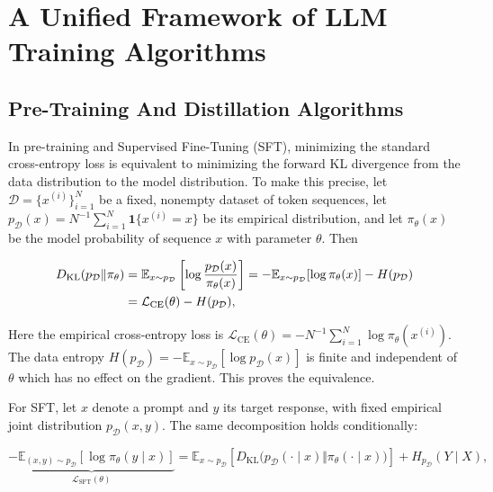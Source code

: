 \section{A Unified Framework of LLM Training Algorithms}

\subsection{Pre-Training And Distillation Algorithms}

In pre-training and Supervised Fine-Tuning (SFT), minimizing the standard
cross-entropy loss is equivalent to minimizing the forward KL divergence
from the data distribution to the model distribution.
To make this precise, let $\mathcal{D}=\{x^{(i)}\}_{i=1}^N$ be a fixed,
nonempty dataset of token sequences, let
$p_{\mathcal{D}}(x)=N^{-1}\sum_{i=1}^N\mathbf{1}\{x^{(i)}=x\}$ be its
empirical distribution, and let $\pi_\theta(x)$ be the model probability
of sequence $x$ with parameter $\theta$. Then

\begin{align}
 D_{\mathrm{KL}}(p_{\mathcal{D}}\Vert\pi_\theta)
 &= \mathbb{E}_{x\sim p_{\mathcal{D}}}
    \left[\log\frac{p_{\mathcal{D}}(x)}{\pi_\theta(x)}\right] \notag = -\mathbb{E}_{x\sim p_{\mathcal{D}}}[\log\pi_\theta(x)]
    -H(p_{\mathcal{D}}) \notag\\
 &= \mathcal{L}_{\mathrm{CE}}(\theta)-H(p_{\mathcal{D}}),
 \label{eq:ce-forward-kl}
\end{align}

Here the empirical cross-entropy loss is
$\mathcal{L}_{\mathrm{CE}}(\theta)=-N^{-1}\sum_{i=1}^N
\log\pi_\theta(x^{(i)})$.
The data entropy $H(p_{\mathcal{D}})=-\mathbb{E}_{x\sim p_{\mathcal{D}}}
[\log p_{\mathcal{D}}(x)]$ is finite and independent of $\theta$ which has no effect on the gradient. This proves the equivalence.

For SFT, let $x$ denote a prompt and $y$ its target response, with fixed
empirical joint distribution $p_{\mathcal{D}}(x,y)$. The same decomposition
holds conditionally:

\begin{equation}
 \underbrace{-\mathbb{E}_{(x,y)\sim p_{\mathcal{D}}}
 [\log\pi_\theta(y\mid x)]}_{\mathcal{L}_{\mathrm{SFT}}(\theta)}
 =\mathbb{E}_{x\sim p_{\mathcal{D}}}
 \left[D_{\mathrm{KL}}\bigl(p_{\mathcal{D}}(\cdot\mid x)
 \Vert\pi_\theta(\cdot\mid x)\bigr)\right]
 +H_{p_{\mathcal{D}}}(Y\mid X),
 \label{eq:sft-conditional-kl}
\end{equation}

